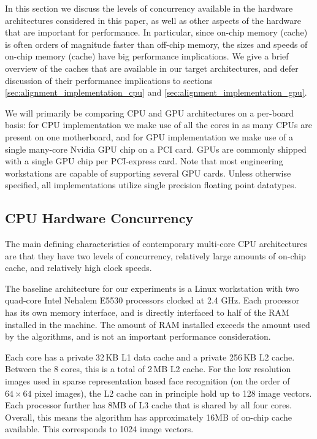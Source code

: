\documentclass[10pt,twocolumn,letterpaper]{article}
\begin{document}
In this section we discuss the levels of concurrency available in the hardware
architectures considered in this paper, as well as other aspects of the
hardware that are important for performance.  In particular, since on-chip
memory (cache) is often orders of magnitude faster than off-chip memory, the
sizes and speeds of on-chip memory (cache) have big performance implications.
We give a brief overview of the caches that are available in our target
architectures, and defer discussion of their performance implications to
sections \ref{sec:alignment_implementation_cpu} and
\ref{sec:alignment_implementation_gpu}.

We will primarily be comparing CPU and GPU architectures on a per-board basis:
for CPU implementation we make use of all the cores in as many CPUs are present
on one motherboard, and for GPU implementation we make use of a single
many-core Nvidia GPU chip on a PCI card. GPUs are commonly shipped with a
single GPU chip per PCI-express card.  Note that most engineering  workstations
are capable of supporting several GPU cards.  Unless otherwise specified, all
implementations utilize single precision floating point datatypes.  

\subsection{CPU Hardware Concurrency} 
The main defining characteristics of contemporary multi-core CPU architectures
are that they have two levels of concurrency, relatively large amounts of
on-chip cache, and relatively high clock speeds.

The baseline architecture for our experiments is a Linux workstation with two
quad-core Intel Nehalem E5530 processors clocked at 2.4 GHz.  Each processor
has its own memory interface, and is directly interfaced to half of the RAM
installed in the machine.  The amount of RAM installed exceeds the amount used
by the algorithms, and is not an important performance consideration.  

Each core has a private 32\,KB L1 data cache and a private 256\,KB L2 cache.  
Between the 8 cores, this is a total of 2\,MB L2 cache.
For the low resolution images used in sparse representation based
face recognition (on the order of $64\times64$ pixel images), the L2 cache
can in principle hold up to 128 image vectors.
Each processor further has 8MB of L3 cache that is shared by all four cores.
Overall, this means the algorithm has approximately 16MB of on-chip cache
available.  This corresponds to 1024 image vectors.  
\end{document}

